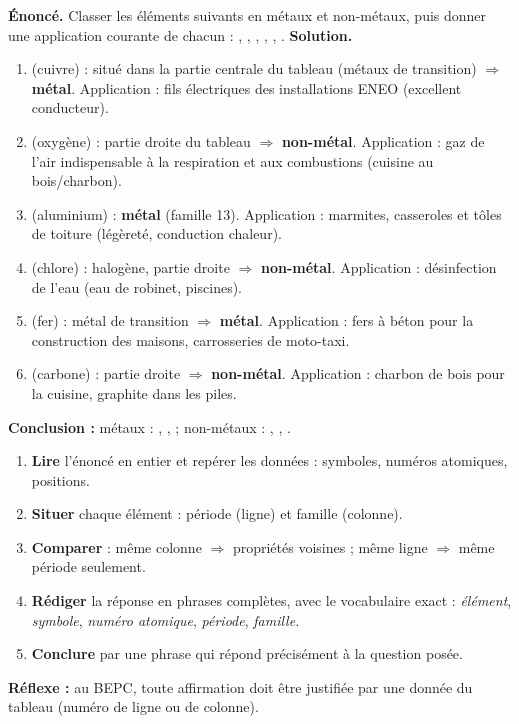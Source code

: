 \documentclass[11pt]{article}
\begin{document}
\begin{exoresolu}
\textbf{Énoncé.} Classer les éléments suivants en métaux et non-métaux, puis donner une application courante de chacun : , , , , , .
\tcblower
\textbf{Solution.}
\begin{enumerate}
\item {} (cuivre) : situé dans la partie centrale du tableau (métaux de transition) $\Rightarrow$ \textbf{métal}. Application : fils électriques des installations ENEO (excellent conducteur).
\item {} (oxygène) : partie droite du tableau $\Rightarrow$ \textbf{non-métal}. Application : gaz de l'air indispensable à la respiration et aux combustions (cuisine au bois/charbon).
\item {} (aluminium) : \textbf{métal} (famille 13). Application : marmites, casseroles et tôles de toiture (légèreté, conduction chaleur).
\item {} (chlore) : halogène, partie droite $\Rightarrow$ \textbf{non-métal}. Application : désinfection de l'eau (eau de robinet, piscines).
\item {} (fer) : métal de transition $\Rightarrow$ \textbf{métal}. Application : fers à béton pour la construction des maisons, carrosseries de moto-taxi.
\item {} (carbone) : partie droite $\Rightarrow$ \textbf{non-métal}. Application : charbon de bois pour la cuisine, graphite dans les piles.
\end{enumerate}
\textbf{Conclusion :} métaux : , ,  ; non-métaux : , , .
\end{exoresolu}

\begin{methode}
\begin{enumerate}
\item \textbf{Lire} l'énoncé en entier et repérer les données : symboles, numéros atomiques, positions.
\item \textbf{Situer} chaque élément : période (ligne) et famille (colonne).
\item \textbf{Comparer} : même colonne $\Rightarrow$ propriétés voisines ; même ligne $\Rightarrow$ même période seulement.
\item \textbf{Rédiger} la réponse en phrases complètes, avec le vocabulaire exact : \emph{élément}, \emph{symbole}, \emph{numéro atomique}, \emph{période}, \emph{famille}.
\item \textbf{Conclure} par une phrase qui répond précisément à la question posée.
\end{enumerate}
\textbf{Réflexe :} au BEPC, toute affirmation doit être justifiée par une donnée du tableau (numéro de ligne ou de colonne).
\end{methode}
\end{document}
